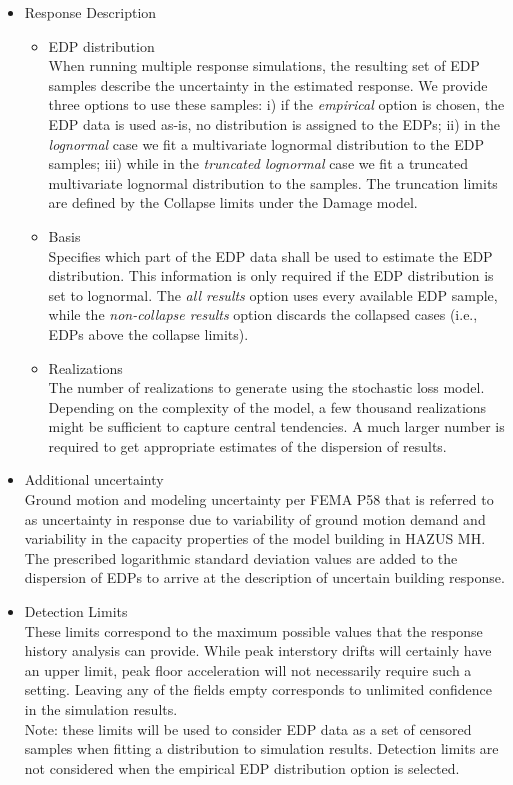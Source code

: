 \begin{itemize}
    \item Response Description
    \begin{itemize}
        \item EDP distribution\\
        When running multiple response simulations, the resulting set of EDP samples describe the uncertainty in the estimated response. We provide three options to use these samples: i) if the  \textit{empirical} option is chosen, the EDP data is used as-is, no distribution is assigned to the EDPs; ii) in the \textit{lognormal} case we fit a multivariate lognormal distribution to the EDP samples; iii) while in the \textit{truncated lognormal} case we fit a truncated multivariate lognormal distribution to the samples. The truncation limits are defined by the Collapse limits under the Damage model.
        \item Basis\\
        Specifies which part of the EDP data shall be used to estimate the EDP distribution. This information is only required if the EDP distribution is set to lognormal. The \textit{all results} option uses every available EDP sample, while the \textit{non-collapse results} option discards the collapsed cases (i.e., EDPs above the collapse limits).
        \item Realizations\\
        The number of realizations to generate using the stochastic loss model. Depending on the complexity of the model, a few thousand realizations might be sufficient to capture central tendencies. A much larger number is required to get appropriate estimates of the dispersion of results.
    \end{itemize}
    \item Additional uncertainty\\
    Ground motion and modeling uncertainty per FEMA P58 that is referred to as uncertainty in response due to variability of ground motion demand and variability in the capacity properties of the model building in HAZUS MH. The prescribed logarithmic standard deviation values are added to the dispersion of EDPs to arrive at the description of uncertain building response.
    \item Detection Limits\\
    These limits correspond to the maximum possible values that the response history analysis can provide. While peak interstory drifts will certainly have an upper limit, peak floor acceleration will not necessarily require such a setting. Leaving any of the fields empty corresponds to unlimited confidence in the simulation results.\\
    Note: these limits will be used to consider EDP data as a set of censored samples when fitting a distribution to simulation results. Detection limits are not considered when the empirical EDP distribution option is selected.
\end{itemize}

